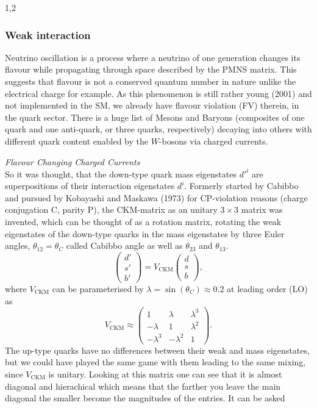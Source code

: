 \documentclass[11pt,a4paper,twoside]{article}
\begin{document}
\begin{spacing}{1,2}
\subsubsection{Weak interaction}
Neutrino oscillation is a process where a neutrino of one generation changes its flavour while propagating through space described by the PMNS matrix. 
This suggests that 
flavour is not a conserved quantum number in nature unlike the electrical charge for example. As this phenomenon is still rather young (2001) and not implemented in the 
SM, we already have flavour violation (FV) therein, in the quark sector. There is a huge list of Mesons and Baryons (composites of one quark and one anti-quark,
or three quarks, respectively) decaying into others with different quark content enabled by the $W$-bosons via charged currents. 

\textit{Flavour Changing Charged Currents}\\
\noindent So it was thought, that the down-type quark mass
eigenstates $d'^i$ are superpositions of their interaction eigenstates $d^i$. Formerly started by Cabibbo and pursued by 
Kobayashi and Maskawa (1973) for CP-violation reasons (charge conjugation C, parity P), the CKM-matrix as an unitary $3\times 3$ matrix was invented,
which can be thought of as a rotation
matrix, rotating the weak eigenstates of the down-type quarks in the mass eigenstates by three Euler angles, $\theta_{12} = \theta_C$ called Cabibbo angle 
as well as $\theta_{23}$ and $\theta_{13}$.
\begin{equation}
 \begin{pmatrix}
  d' \\ s' \\ b'
 \end{pmatrix} = V_\text{CKM}  \begin{pmatrix}
  d \\ s \\ b
 \end{pmatrix},
\end{equation}
\noindent
where $V_\text{CKM}$ can be parameterised by $\lambda = \sin(\theta_C) \approx 0.2$ at leading order (LO) as
\begin{equation}
 V_\text{CKM} \approx \begin{pmatrix}
  1 & \lambda & \lambda^3\\
  -\lambda & 1 & \lambda^2\\
  -\lambda^3 & -\lambda^2 & 1
 \end{pmatrix}.
\end{equation}
The up-type quarks have no differences between their weak and mass eigenstates, but we could have played the same game with them leading to the 
same mixing, since $V_\text{CKM}$ is unitary. Looking at this matrix one can see that it is almost diagonal and hierachical which
means that the farther you leave the main diagonal the smaller become the magnitudes of the entries. It can be asked 


\end{spacing}
\end{document}
